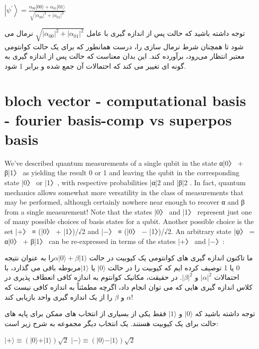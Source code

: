 \documentclass{book}
\begin{document}
\begin{center}
	$\left|\psi^{\prime}\right\rangle=\frac{\alpha_{00}|00\rangle+\alpha_{01}|01\rangle}{\sqrt{\left|\alpha_{00}\right|^2+\left|\alpha_{01}\right|^2}}$
\end{center}
توجه داشته باشید که حالت پس از اندازه گیری با عامل $\sqrt{|{α}_{00}|^2 + |{α}_{01}|^2}$ نرمال می شود
تا همچنان شرط نرمال سازی را، درست همانطور که برای یک
حالت کوانتومی معتبر انتظار می‌‌رود، برآورده کند. این بدان معناست که حالت پس از اندازه گیری به گونه ای تغییر می کند که احتمالات آن جمع شده و برابر 1 شود.

\section{bloch vector - computational basis - fourier basis-comp vs superpos basis}


We’ve described quantum measurements of a single qubit in the state α|0〉 + β|1〉 as
yielding the result 0 or 1 and leaving the qubit in the corresponding state |0〉 or |1〉,
with respective probabilities |α|2 and |β|2 . In fact, quantum mechanics allows somewhat
more versatility in the class of measurements that may be performed, although certainly
nowhere near enough to recover α and β from a single measurement!
Note that the states |0〉 and |1〉 represent just one of many possible choices of basis
states for a qubit. Another possible choice is the set |+〉 ≡ (|0〉 + |1〉)/√2 and |−〉 ≡
(|0〉 − |1〉)/√2. An arbitrary state |ψ〉 = α|0〉 + β|1〉 can be re-expressed in terms of the
states |+〉 and |−〉:





ما تاکنون اندازه گیری های کوانتومی یک کیوبیت در حالت $\alpha\vert0\rangle + \beta\vert1\rangle$را به عنوان نتیجه 0 یا 1 توصیف کرده ایم که کیوبیت را در حالت $\vert 0 \rangle$ یا $\vert 1 \rangle$مربوطه باقی می گذارد، با احتمالات $\vert\alpha\vert ^ 2$ و $\vert\beta\vert ^ 2$. در حقیقت، مکانیک کوانتوم به اندازه کافی انعطاف پذیری در کلاس اندازه گیری هایی که می توان انجام داد، اگرچه مطمئناً به اندازه کافی نیست که $\alpha$ و $\beta$ را از یک اندازه گیری واحد بازیابی کند!

توجه داشته باشید که $\vert 0 \rangle$ و $\vert 1 \rangle$ فقط یکی از بسیاری از انتخاب های ممکن برای پایه های حالت برای یک کیوبیت هستند. یک انتخاب دیگر مجموعه به شرح زیر است:
\begin{center}
$\vert+\rangle  \equiv (\vert0\rangle + \vert1\rangle)\sqrt{2}$
$\vert-\rangle \equiv  (\vert0\rangle - \vert1\rangle)\sqrt{2}$
\end{center}
 
\end{document}
